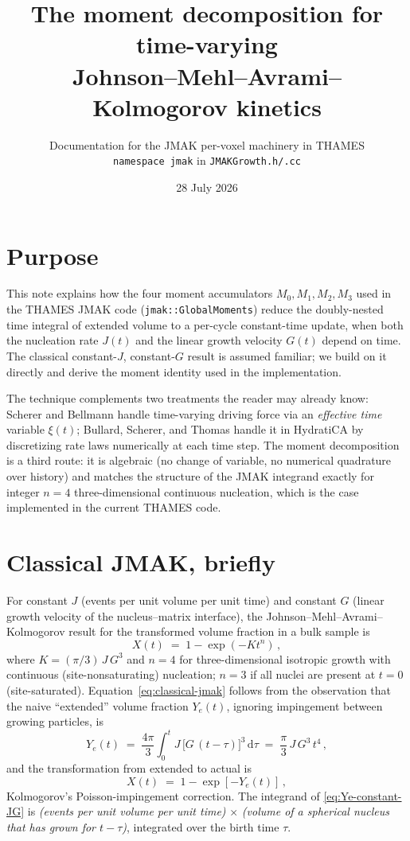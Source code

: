 \documentclass[11pt]{article}
\title{The moment decomposition for time-varying \\
       Johnson--Mehl--Avrami--Kolmogorov kinetics}
\author{Documentation for the JMAK per-voxel machinery in THAMES \\
        \texttt{namespace jmak} in \texttt{JMAKGrowth.h/.cc}}
\date{28 July 2026}
\begin{document}
\maketitle

\section{Purpose}

This note explains how the four moment accumulators
$M_0, M_1, M_2, M_3$ used in the THAMES JMAK code
(\texttt{jmak::GlobalMoments}) reduce the doubly-nested time integral
of extended volume to a per-cycle constant-time update, when both
the nucleation rate $J(t)$ and the linear growth velocity $G(t)$
depend on time.
The classical constant-$J$, constant-$G$ result is assumed familiar;
we build on it directly and derive the moment identity used in the
implementation.

The technique complements two treatments the reader may already know:
Scherer and Bellmann\cite{Scherer2018} handle time-varying driving
force via an \emph{effective time} variable
$\xi(t)$; Bullard, Scherer, and Thomas\cite{Bullard2015} handle it in
HydratiCA by discretizing rate laws numerically at each time step.
The moment decomposition is a third route: it is algebraic (no change
of variable, no numerical quadrature over history) and matches the
structure of the JMAK integrand exactly for integer $n=4$
three-dimensional continuous nucleation, which is the case implemented
in the current THAMES code.

\section{Classical JMAK, briefly}

For constant $J$ (events per unit volume per unit time) and constant
$G$ (linear growth velocity of the nucleus--matrix interface), the
Johnson--Mehl--Avrami--Kolmogorov result for the transformed volume
fraction in a bulk sample is
\begin{equation}
X(t) \;=\; 1 - \exp\!\left(-K t^{n}\right)\,,
\label{eq:classical-jmak}
\end{equation}
where $K = (\pi / 3)\, J\, G^{3}$ and $n = 4$ for three-dimensional
isotropic growth with continuous (site-nonsaturating) nucleation;
$n = 3$ if all nuclei are present at $t=0$ (site-saturated).
Equation~\eqref{eq:classical-jmak} follows from the observation that
the naive
``extended'' volume fraction $Y_e(t)$, ignoring impingement between
growing particles, is
\begin{equation}
Y_e(t) \;=\; \frac{4\pi}{3}\int_{0}^{t} J\,\bigl[G\,(t-\tau)\bigr]^{3}\,\mathrm{d}\tau
       \;=\; \frac{\pi}{3}\, J\, G^{3}\, t^{4}\,,
\label{eq:Ye-constant-JG}
\end{equation}
and the transformation from extended to actual is
\begin{equation}
X(t) \;=\; 1 - \exp[-Y_e(t)]\,,
\label{eq:X-from-Ye}
\end{equation}
Kolmogorov's Poisson-impingement correction.
The integrand of \eqref{eq:Ye-constant-JG} is
\emph{(events per unit volume per unit time)} $\times$
\emph{(volume of a spherical nucleus that has grown for
$t - \tau$)}, integrated over the birth time $\tau$.
\end{document}
